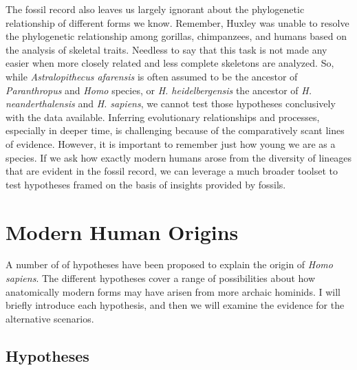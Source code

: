 \documentclass[
]{book}
\begin{document}
The fossil record also leaves us largely ignorant about the phylogenetic relationship of different forms we know. Remember, Huxley was unable to resolve the phylogenetic relationship among gorillas, chimpanzees, and humans based on the analysis of skeletal traits. Needless to say that this task is not made any easier when more closely related and less complete skeletons are analyzed. So, while \emph{Astralopithecus afarensis} is often assumed to be the ancestor of \emph{Paranthropus} and \emph{Homo} species, or \emph{H. heidelbergensis} the ancestor of \emph{H. neanderthalensis} and \emph{H. sapiens}, we cannot test those hypotheses conclusively with the data available. Inferring evolutionary relationships and processes, especially in deeper time, is challenging because of the comparatively scant lines of evidence. However, it is important to remember just how young we are as a species. If we ask how exactly modern humans arose from the diversity of lineages that are evident in the fossil record, we can leverage a much broader toolset to test hypotheses framed on the basis of insights provided by fossils.

\hypertarget{modern-human-origins}{%
\section{Modern Human Origins}\label{modern-human-origins}}

A number of of hypotheses have been proposed to explain the origin of \emph{Homo sapiens}. The different hypotheses cover a range of possibilities about how anatomically modern forms may have arisen from more archaic hominids. I will briefly introduce each hypothesis, and then we will examine the evidence for the alternative scenarios.

\hypertarget{hypotheses}{%
\subsection{Hypotheses}\label{hypotheses}}
\end{document}
